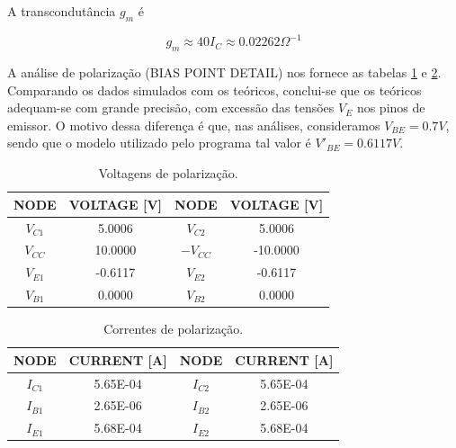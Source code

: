 \documentclass[12pt, a4paper]{article}
\begin{document}
\begin{enumerate}
        A transcondutância \(g_m\) é
        
        \begin{equation} \label{eq:gm}
        g_m \approx 40I_C \approx 0.02262 \Omega ^{-1}
        \end{equation}
        
        A análise de polarização (BIAS POINT DETAIL) nos fornece as tabelas \ref{table:tabelaVoltagemBIAS} e \ref{table:tabelaCorrenteBIAS}. Comparando os dados simulados com os teóricos, conclui-se que os teóricos adequam-se com grande precisão, com excessão das tensões \(V_E\) nos pinos de emissor. O motivo dessa diferença é que, nas análises, consideramos \(V_{BE} = 0.7V\), sendo que o modelo utilizado pelo programa tal valor é \(V'_{BE} = 0.6117V\).
        
        \begin{table} [h!]
            \caption{Voltagens de polarização. }
            \centering
            \label{table:tabelaVoltagemBIAS}
            
                \begin{tabular}{ c | c | c | c } 
        
                NODE & VOLTAGE [V] & NODE & VOLTAGE [V] \\
                \hline
                \(V_{C1}\) & 5.0006 & \(V_{C2}\) & 5.0006 \\
                \(V_{CC}\) & 10.0000 & \(-V_{CC}\) & -10.0000 \\
                \(V_{E1}\) & -0.6117 & \(V_{E2}\) & -0.6117\\
                \(V_{B1}\) & 0.0000 & \(V_{B2}\) & 0.0000\\
                
                \end{tabular}
       \end{table}  
       
       \begin{table} [h!]
            \caption{Correntes de polarização. }
            \centering
            \label{table:tabelaCorrenteBIAS}
            
                \begin{tabular}{ c | c | c | c } 
        
                NODE & CURRENT [A] & NODE & CURRENT [A] \\
                \hline
                \(I_{C1}\) & 5.65E-04 & \(I_{C2}\) & 5.65E-04 \\
                \(I_{B1}\) & 2.65E-06 & \(I_{B2}\) & 2.65E-06\\
                \(I_{E1}\) & 5.68E-04 & \(I_{E2}\) & 5.68E-04\\
                

\end{tabular}
\end{table}
\end{enumerate}
\end{document}
